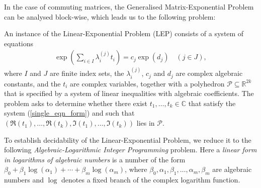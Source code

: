 In the case of commuting matrices, the Generalised Matrix-Exponential
Problem can be analysed block-wise, which leads us to the following
problem:

\begin{definition}
  An instance of the Linear-Exponential Problem (LEP) consists of a system
  of equations
\begin{align}
\label{single_eqn_form}
  \exp\left(\sum_{i \in I} \lambda_i^{(j)} t_i \right) = c_j \exp (d_j)
\quad (j \in J),
\end{align}
where $I$ and $J$ are finite index sets, the $\lambda_i^{(j)}$, $c_j$
and $d_j$ are complex algebraic constants, and the $t_i$ are complex
variables, together with a polyhedron
$\mathcal{P} \subseteq \mathbb{R}^{2k}$ that is specified by a system
of linear inequalities with algebraic coefficients.  The problem asks
to determine whether there exist $t_1,\ldots,t_k\in \mathbb{C}$ that
satisfy the system (\ref{single_eqn_form}) and such that
$(\Re(t_1),\ldots,\Re(t_k),\Im(t_1),\ldots,\Im(t_k))$
lies in $\mathcal{P}$.
\label{def:LEP}
\end{definition}

To establish decidability of the Linear-Exponential Problem, we reduce
it to the following
\emph{Algebraic-Logarithmic Integer Programming}
problem.  Here a \emph{linear form in logarithms of algebraic numbers}
is a number of the form
$\beta_{0} + \beta_{1} \log(\alpha_{1}) + \cdots + \beta_{m}
\log(\alpha_{m})$,
where
$\beta_{0}, \alpha_{1}, \beta_{1}, \ldots, \alpha_{m}, \beta_{m}$ are
algebraic numbers and $\log$ denotes a fixed branch of the complex
logarithm function.



